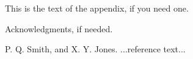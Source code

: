 \documentclass{sigplanconf}
\begin{document}
This is the text of the appendix, if you need one.

\acks

Acknowledgments, if needed.





\begin{thebibliography}{}
\softraggedright

P. Q. Smith, and X. Y. Jones. ...reference text...

\end{thebibliography}
\end{document}
